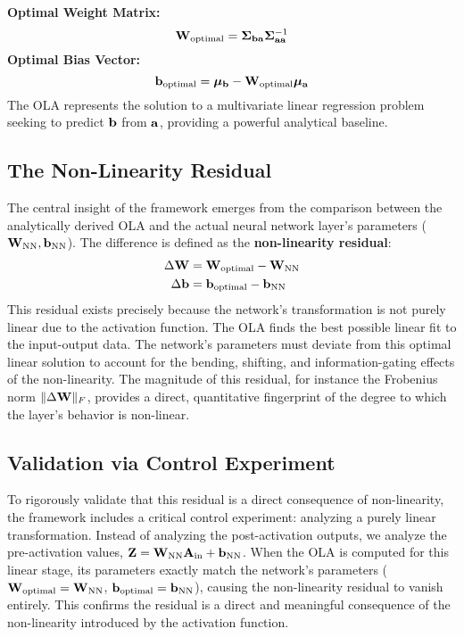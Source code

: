 \textbf{Optimal Weight Matrix:}
\begin{equation}
\mathbf{W}_{\text{optimal}} = \boldsymbol{\Sigma}_{\mathbf{ba}} \boldsymbol{\Sigma}_{\mathbf{aa}}^{-1}
\end{equation}
\textbf{Optimal Bias Vector:}
\begin{equation}
\mathbf{b}_{\text{optimal}} = \boldsymbol{\mu}_{\mathbf{b}} - \mathbf{W}_{\text{optimal}} \boldsymbol{\mu}_{\mathbf{a}}
\end{equation}
The OLA represents the solution to a multivariate linear regression problem seeking to predict $\mathbf{b}$ from $\mathbf{a}$, providing a powerful analytical baseline.

\subsection{The Non-Linearity Residual}
The central insight of the framework emerges from the comparison between the analytically derived OLA and the actual neural network layer's parameters ($\mathbf{W}_{\text{NN}}, \mathbf{b}_{\text{NN}}$). The difference is defined as the \textbf{non-linearity residual}:
\begin{align}
\Delta\mathbf{W} &= \mathbf{W}_{\text{optimal}} - \mathbf{W}_{\text{NN}} \\
\Delta\mathbf{b} &= \mathbf{b}_{\text{optimal}} - \mathbf{b}_{\text{NN}}
\end{align}
This residual exists precisely because the network's transformation is not purely linear due to the activation function. The OLA finds the best possible linear fit to the input-output data. The network's parameters must deviate from this optimal linear solution to account for the bending, shifting, and information-gating effects of the non-linearity. The magnitude of this residual, for instance the Frobenius norm $\|\Delta\mathbf{W}\|_F$, provides a direct, quantitative fingerprint of the degree to which the layer's behavior is non-linear.

\subsection{Validation via Control Experiment}
To rigorously validate that this residual is a direct consequence of non-linearity, the framework includes a critical control experiment: analyzing a purely linear transformation. Instead of analyzing the post-activation outputs, we analyze the pre-activation values, $\mathbf{Z} = \mathbf{W}_{\text{NN}}\mathbf{A}_{\text{in}} + \mathbf{b}_{\text{NN}}$. When the OLA is computed for this linear stage, its parameters exactly match the network's parameters ($\mathbf{W}_{\text{optimal}} = \mathbf{W}_{\text{NN}}$, $\mathbf{b}_{\text{optimal}} = \mathbf{b}_{\text{NN}}$), causing the non-linearity residual to vanish entirely. This confirms the residual is a direct and meaningful consequence of the non-linearity introduced by the activation function.

